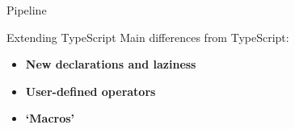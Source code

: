 \documentclass[aspectratio=169]{beamer}
\begin{document}
\begin{frame}[fragile]{Pipeline}
\begin{overprint}
\begin{center}
            \end{center}
        \end{overprint}
    \end{frame}
    \begin{frame}[fragile]{Extending TypeScript}
            Main differences from TypeScript:
        \begin{itemize}
            \itemsep0.75em
            \item<2-> \textbf<2-3>{New declarations and laziness}
            \item<4-> \textbf<4-5>{User-defined operators}
            \item<6-> \textbf<6-7>{`Macros'}
        \end{itemize}
        \bigskip


\end{frame}
\end{document}
